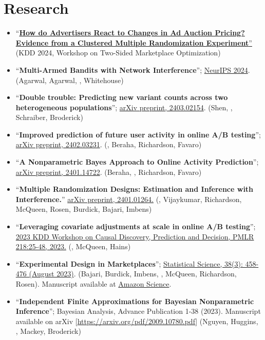 \documentclass[10pt, a4paper]{article}
\newcommand{\years}[1]{\marginnote{\scriptsize #1}}
\begin{document}
\section*{Research}
\begin{itemize}
	\item ``\href{https://assets.amazon.science/f2/fe/e1408dd94a529618b19e8c56eb3f/how-do-advertisers-react-to-changes-in-ad-auction-pricing.pdf}{{\textbf{How do Advertisers React to Changes in Ad Auction Pricing? Evidence from a Clustered Multiple Randomization Experiment}}''} (KDD 2024, Workshop on Two-Sided Marketplace Optimization)
	\item ``\textbf{Multi-Armed Bandits with Network Interference}''; \href{https://arxiv.org/abs/2405.18621}{NeurIPS 2024}. (Agarwal, Agarwal, \mm, Whitehouse)
	\item ``\textbf{Double trouble: Predicting new variant counts across two heterogeneous populations}''; \href{https://arxiv.org/pdf/2403.02154.pdf}{arXiv preprint, 2403.02154}. (Shen, \mm, Schraiber, Broderick)
	\item ``\textbf{Improved prediction of future user activity in online A/B testing}''; \href{https://arxiv.org/abs/2402.03231}{arXiv preprint, 2402.03231}. (\mm, Beraha, Richardson, Favaro)
	\item ``\textbf{A Nonparametric Bayes Approach to Online Activity Prediction}''; \href{https://arxiv.org/abs/2401.14722}{arXiv preprint, 2401.14722}. (Beraha, \mm, Richardson, Favaro)
	\item ``\textbf{Multiple Randomization Designs: Estimation and Inference with Interference.}'' \href{https://arxiv.org/abs/2401.01264}{arXiv preprint, 2401.01264.} (\mm, Vijaykumar, Richardson, McQueen, Rosen, Burdick, Bajari, Imbens) 
	\item ``\textbf{Leveraging covariate adjustments at scale in online A/B testing}''; \href{https://proceedings.mlr.press/v218/masoero23a.html}{2023 KDD Workshop on Causal Discovery, Prediction and Decision, PMLR 218:25-48, 2023.} (\mm, McQueen, Hains)
	\item ``\textbf{Experimental Design in Marketplaces}''; \href{https://projecteuclid.org/journals/statistical-science/advance-publication/Experimental-Design-in-Marketplaces/10.1214/23-STS883.short}{Statistical Science, 38(3): 458-476 (August 2023)}. (Bajari, Burdick, Imbens, \mm, McQueen, Richardson, Rosen). Manuscript available at \href{https://www.amazon.science/publications/experimental-design-in-marketplaces}{Amazon Science}.
	\item ``\textbf{Independent Finite Approximations for Bayesian Nonparametric Inference}''; Bayesian Analysis, Advance Publication 1-38 (2023). Manuscript available on arXiv [\url{https://arxiv.org/pdf/2009.10780.pdf}] (Nguyen, Huggins, \mm, Mackey, Broderick)

\end{itemize}
\end{document}
